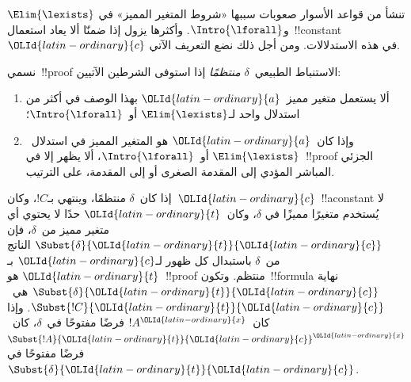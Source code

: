 \documentclass[../../../include/open-logic-section]{subfiles}
\begin{document}


تنشأ من قواعد الأسوار صعوبات سببها «شروط المتغير المميز» في
$\Elim{\lexists}$ و$\Intro{\lforall}$. وأكثرها يزول إذا ضمنّا ألا يعاد
استعمال~!!{constant}~${\OLId{latin-ordinary}{c}}$ في هذه الاستدلالات. ومن أجل ذلك نضع التعريف
الآتي.

\begin{defn}
نسمي~!!{proof} الاستنباط الطبيعي~$\delta$ \emph{منتظمًا} إذا استوفى
الشرطين الآتيين:
\begin{enumerate}
  \item ألا يستعمل متغير مميز~${\OLId{latin-ordinary}{a}}$ بهذا الوصف في أكثر من استدلال واحد
  لـ$\Elim{\lexists}$ أو~$\Intro{\lforall}$؛
  \item وإذا كان~${\OLId{latin-ordinary}{a}}$ هو المتغير المميز في استدلال~$\Elim{\lexists}$
  أو~$\Intro{\lforall}$، ألا يظهر إلا في~!!{proof} الجزئي المباشر المؤدي
  إلى المقدمة الصغرى أو إلى المقدمة، على الترتيب.
\end{enumerate}
\end{defn}

\begin{lem} إذا كان~$\delta$ منتظمًا،
وينتهي بـ$!C$، وكان~${\OLId{latin-ordinary}{c}}$~!!a{constant} لا يُستخدم متغيرًا مميزًا في
$\delta$، وكان~${\OLId{latin-ordinary}{t}}$ حدًا لا يحتوي أي متغير مميز من~$\delta$، فإن
$\Subst{\delta}{{\OLId{latin-ordinary}{t}}}{{\OLId{latin-ordinary}{c}}}$ الناتج من~$\delta$ باستبدال كل ظهور لـ${\OLId{latin-ordinary}{c}}$ بـ
${\OLId{latin-ordinary}{t}}$ هو~!!{proof} منتظم. وتكون~!!{formula} نهاية
$\Subst{\delta}{{\OLId{latin-ordinary}{t}}}{{\OLId{latin-ordinary}{c}}}$ هي~$\Subst{!C}{{\OLId{latin-ordinary}{t}}}{{\OLId{latin-ordinary}{c}}}$. وإذا كان~$!A^{\OLId{latin-ordinary}{x}}$ فرضًا
مفتوحًا في~$\delta$، كان~$\Subst{!A}{{\OLId{latin-ordinary}{t}}}{{\OLId{latin-ordinary}{c}}}^{\OLId{latin-ordinary}{x}}$ فرضًا مفتوحًا في
$\Subst{\delta}{{\OLId{latin-ordinary}{t}}}{{\OLId{latin-ordinary}{c}}}$.
\end{lem}
\end{document}
